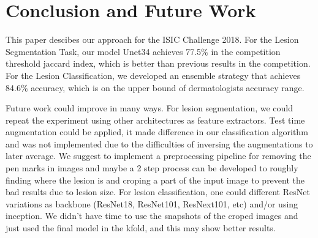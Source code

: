 \section{Conclusion and Future Work}

This paper descibes our approach for the ISIC Challenge 2018. For the Lesion Segmentation Task, our model Unet34 achieves 77.5\% in the competition threshold jaccard index, which is better than previous results in the competition. For the Lesion Classification, we developed an ensemble strategy that achieves 84.6\% accuracy, which is on the upper bound of dermatologists accuracy range.

Future work could improve in many ways. For lesion segmentation, we could repeat the experiment using other architectures as feature extractors. Test time augmentation could be applied, it made difference in our classification algorithm and was not implemented due to the difficulties of inversing the augmentations to later average.  We suggest to implement a preprocessing pipeline for removing the pen marks in images and maybe a 2 step process can be developed to roughly finding where the lesion is and croping a part of the input image to prevent the bad results due to lesion size. For lesion classification, one could different ResNet variations as backbone (ResNet18, ResNet101, ResNext101, etc) and/or using inception. We didn't have time to use the snapshots of the croped images and just used the final model in the kfold, and this may show better results.

